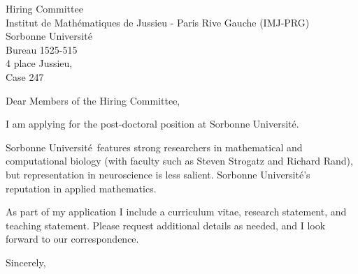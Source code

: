 \documentclass[11pt,a4paper]{letter}
\begin{document}
\def\School{Sorbonne Universit\'{e}}
\begin{letter}
{Hiring Committee\\
Institut de Math\'{e}matiques de Jussieu - Paris Rive Gauche (IMJ-PRG)\\
Sorbonne Universit\'{e}\\
Bureau 1525-515\\
4 place Jussieu,\\
Case 247}


\opening{Dear Members of the Hiring Committee,}

I am applying for the post-doctoral position at \School. 



\School~features strong researchers in mathematical and computational biology (with faculty such as Steven Strogatz and Richard Rand), but representation in neuroscience is less salient. \School's  reputation in applied mathematics.

As part of my application I include a curriculum vitae, research statement, and teaching statement. Please request additional details as needed, and I look forward to our correspondence.

\closing{Sincerely,}
\end{letter}
\end{document}
